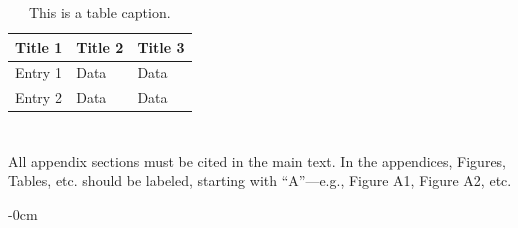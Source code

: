\documentclass[journal,article,submit,pdftex,moreauthors]{Definitions/mdpi}
\begin{document}
\begin{itemize}
\begin{table}[H] 
\caption{This is a table caption.\label{tab5}}
\begin{tabularx}{\textwidth}{CCC}
\toprule
\textbf{Title 1}	& \textbf{Title 2}	& \textbf{Title 3}\\
\midrule
Entry 1		& Data			& Data\\
Entry 2		& Data			& Data\\
\bottomrule
\end{tabularx}
\end{table}

\section[\appendixname~\thesection]{}
All appendix sections must be cited in the main text. In the appendices, Figures, Tables, etc. should be labeled, starting with ``A''---e.g., Figure A1, Figure A2, etc.

\begin{adjustwidth}{-\extralength}{0cm}



% 



\end{adjustwidth}
\end{itemize}
\end{document}
